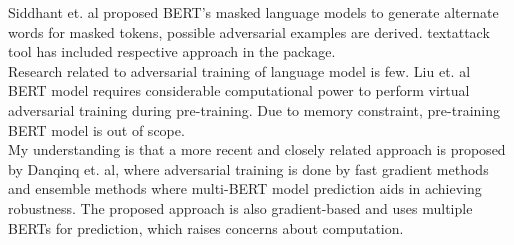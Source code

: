 \documentclass[%
	BCOR=8mm, %
	DIV=12, 
	toc=bibliography, %
	toc=listof, %
	oneside, %
	egregdoesnotlikesansseriftitles, %
	]{scrbook}
\begin{document}
Siddhant et$.$ al\cite{garg_bae_2020} proposed BERT's masked language models to generate alternate words for masked tokens, possible adversarial examples are derived. textattack tool has included respective approach in the package.\\
Research related to adversarial training of language model is few. Liu et$.$ al \cite{liu_adversarial_2020} BERT model requires considerable computational power to perform virtual adversarial training \cite{miyato_virtual_2018} during pre-training. Due to memory constraint, pre-training BERT model is out of scope.\\
My understanding is that a more recent and closely related approach is proposed by Danqinq et$.$ al\cite{zhu_at-bert_2021}, where adversarial training is done by fast gradient methods \cite{miyato_adversarial_2017} and ensemble methods where multi-BERT model prediction aids in achieving robustness.  The proposed approach is also gradient-based and uses multiple BERTs for prediction, which raises concerns about computation. \\
\end{document}
